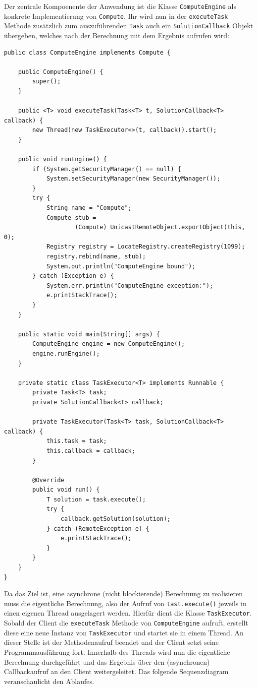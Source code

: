 Der zentrale Kompoenente der Anwendung ist die Klasse \texttt{ComputeEngine} als konkrete Implementierung von \texttt{Compute}.
Ihr wird nun in der \texttt{executeTask} Methode zus\"atzlich zum auszuf\"uhrenden \texttt{Task} auch ein \texttt{SolutionCallback} Objekt \"ubergeben, welches nach der Berechnung mit dem Ergebnis aufrufen wird:
\begin{lstlisting}[style=Java, caption=Funktion zur n\"aeherungweisen Berechnung der Euler'schen Zahl]
public class ComputeEngine implements Compute {

    public ComputeEngine() {
        super();
    }

    public <T> void executeTask(Task<T> t, SolutionCallback<T> callback) {
        new Thread(new TaskExecutor<>(t, callback)).start();
    }

    public void runEngine() {
        if (System.getSecurityManager() == null) {
            System.setSecurityManager(new SecurityManager());
        }
        try {
            String name = "Compute";
            Compute stub =
                    (Compute) UnicastRemoteObject.exportObject(this, 0);
            Registry registry = LocateRegistry.createRegistry(1099);
            registry.rebind(name, stub);
            System.out.println("ComputeEngine bound");
        } catch (Exception e) {
            System.err.println("ComputeEngine exception:");
            e.printStackTrace();
        }
    }

    public static void main(String[] args) {
        ComputeEngine engine = new ComputeEngine();
        engine.runEngine();
    }

    private static class TaskExecutor<T> implements Runnable {
        private Task<T> task;
        private SolutionCallback<T> callback;

        private TaskExecutor(Task<T> task, SolutionCallback<T> callback) {
            this.task = task;
            this.callback = callback;
        }

        @Override
        public void run() {
            T solution = task.execute();
            try {
                callback.getSolution(solution);
            } catch (RemoteException e) {
                e.printStackTrace();
            }
        }
    }
}
\end{lstlisting}

Da das Ziel ist, eine asynchrone (nicht blockierende) Berechnung zu realisieren muss die eigentliche Berechnung, also der Aufruf von \texttt{tast.execute()} jeweils in einen eigenen Thread ausgelagert werden.
Hierf\"ur dient die Klasse \texttt{TaskExecutor}. Sobald der Client die \texttt{executeTask} Methode von \texttt{ComputeEngine} aufruft, erstellt diese eine neue Instanz von \texttt{TaskExecutor} und startet sie in einem Thread.
An dieser Stelle ist der Methodenaufruf beendet und der Client setzt seine Programmausf\"uhrung fort.
Innerhalb des Threads wird nun die eigentliche Berechnung durchgef\"uhrt und das Ergebnis \"uber den (asynchronen) Callbackaufruf an den Client weitergeleitet.
Das folgende Sequenzdiagram veranschaulicht den Ablaufes.


